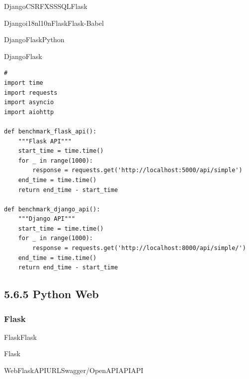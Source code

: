 \important{}DjangoCSRFXSSSQLFlask

\important{}Djangoi18nl10nFlaskFlask-Babel

\important{}DjangoFlaskPython

\important{}DjangoFlask

\begin{lstlisting}[style=python]
# 
import time
import requests
import asyncio
import aiohttp

def benchmark_flask_api():
    """Flask API"""
    start_time = time.time()
    for _ in range(1000):
        response = requests.get('http://localhost:5000/api/simple')
    end_time = time.time()
    return end_time - start_time

def benchmark_django_api():
    """Django API"""
    start_time = time.time()
    for _ in range(1000):
        response = requests.get('http://localhost:8000/api/simple/')
    end_time = time.time()
    return end_time - start_time
\end{lstlisting}

\hypertarget{python-web-2}{%
\subsection{5.6.5 Python Web}\label{python-web-2}}

\hypertarget{flask-3}{%
\subsubsection{Flask}\label{flask-3}}

\important{}FlaskFlask\important{}\important{}\important{}\important{}

\important{}Flask\important{}\important{}\important{}\important{}\important{}

WebFlaskAPIURLSwagger/OpenAPIAPIAPI

